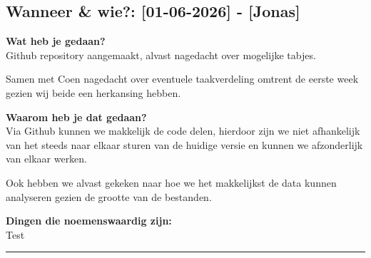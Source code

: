 \subsection*{Wanneer \& wie?: [01-06-2026] - [Jonas]}

\textbf{Wat heb je gedaan?}\\
Github repository aangemaakt, alvast nagedacht over mogelijke tabjes. 

Samen met Coen nagedacht over eventuele taakverdeling omtrent de eerste week gezien wij beide een herkansing hebben. 
\vspace{0.3cm} 

\textbf{Waarom heb je dat gedaan?}\\
Via Github kunnen we makkelijk de code delen, hierdoor zijn we niet afhankelijk van het steeds naar elkaar sturen van de huidige versie en kunnen we afzonderlijk van elkaar werken. 

Ook hebben we alvast gekeken naar hoe we het makkelijkst de data kunnen analyseren gezien de grootte van de bestanden.
\vspace{0.3cm}

\textbf{Dingen die noemenswaardig zijn:}\\
Test


\vspace{0.5cm}
\hrule 
\vspace{0.5cm}